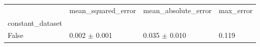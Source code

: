 \begin{tabular}{llll}
\toprule
 & mean_squared_error & mean_absolute_error & max_error \\
constant_dataset &  &  &  \\
\midrule
False & 0.002 $\pm$ 0.001 & 0.035 $\pm$ 0.010 & 0.119 \\
\bottomrule
\end{tabular}
